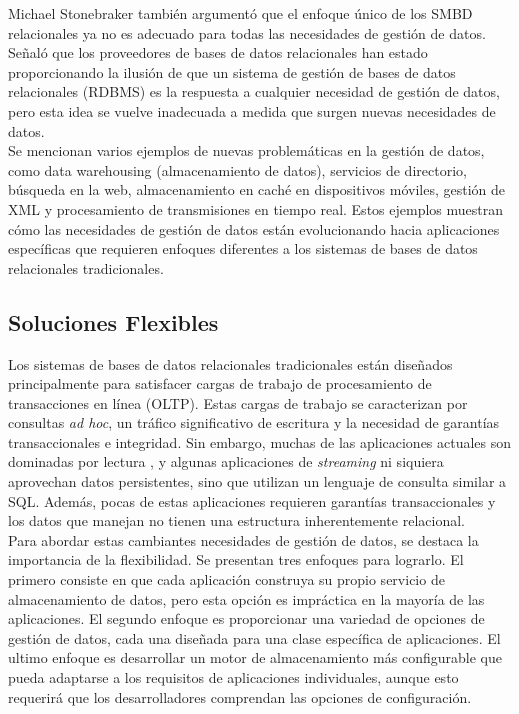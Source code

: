 \documentclass[12pt]{article}
\begin{document}
        Michael Stonebraker también argumentó que el enfoque único de los SMBD relacionales ya no es adecuado para todas las necesidades de gestión de datos. Señaló que los proveedores de bases de datos relacionales han estado proporcionando la ilusión de que un sistema de gestión de bases de datos relacionales (RDBMS) es la respuesta a cualquier necesidad de gestión de datos, pero esta idea se vuelve inadecuada a medida que surgen nuevas necesidades de datos.\\
        
        Se mencionan varios ejemplos de nuevas problemáticas en la gestión de datos, como data warehousing (almacenamiento de datos), servicios de directorio, búsqueda en la web, almacenamiento en caché en dispositivos móviles, gestión de XML y procesamiento de transmisiones en tiempo real. Estos ejemplos muestran cómo las necesidades de gestión de datos están evolucionando hacia aplicaciones específicas que requieren enfoques diferentes a los sistemas de bases de datos relacionales tradicionales.

    \subsection{Soluciones Flexibles}

        Los sistemas de bases de datos relacionales tradicionales están diseñados principalmente para satisfacer cargas de trabajo de procesamiento de transacciones en línea (OLTP). Estas cargas de trabajo se caracterizan por consultas \textit{ad hoc}, un tráfico significativo de escritura y la necesidad de garantías transaccionales e integridad. Sin embargo, muchas de las aplicaciones actuales son dominadas por lectura , y algunas aplicaciones de \textit{streaming} ni siquiera aprovechan datos persistentes, sino que utilizan un lenguaje de consulta similar a SQL. Además, pocas de estas aplicaciones requieren garantías transaccionales y los datos que manejan no tienen una estructura inherentemente relacional.\\

        Para abordar estas cambiantes necesidades de gestión de datos, se destaca la importancia de la flexibilidad. Se presentan tres enfoques para lograrlo. El primero consiste en que cada aplicación construya su propio servicio de almacenamiento de datos, pero esta opción es impráctica en la mayoría de las aplicaciones. El segundo enfoque es proporcionar una variedad de opciones de gestión de datos, cada una diseñada para una clase específica de aplicaciones. El ultimo enfoque es desarrollar un motor de almacenamiento más configurable que pueda adaptarse a los requisitos de aplicaciones individuales, aunque esto requerirá que los desarrolladores comprendan las opciones de configuración.\\
        
\end{document}
